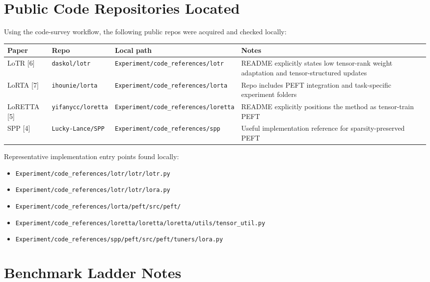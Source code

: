 \documentclass[11pt]{article}
\begin{document}
\section{Public Code Repositories Located}

Using the code-survey workflow, the following public repos were acquired and checked locally:

\begin{longtable}{>{\raggedright\arraybackslash}p{} >{\raggedright\arraybackslash}p{} >{\raggedright\arraybackslash}p{} >{\raggedright\arraybackslash}p{}}
\toprule
Paper & Repo & Local path & Notes \\
\midrule
\endhead
LoTR [6] & \texttt{daskol/lotr} & \texttt{Experiment/code\_references/lotr} & README explicitly states low tensor-rank weight adaptation and tensor-structured updates \\
LoRTA [7] & \texttt{ihounie/lorta} & \texttt{Experiment/code\_references/lorta} & Repo includes PEFT integration and task-specific experiment folders \\
LoRETTA [5] & \texttt{yifanycc/loretta} & \texttt{Experiment/code\_references/loretta} & README explicitly positions the method as tensor-train PEFT \\
SPP [4] & \texttt{Lucky-Lance/SPP} & \texttt{Experiment/code\_references/spp} & Useful implementation reference for sparsity-preserved PEFT \\
\bottomrule
\end{longtable}

Representative implementation entry points found locally:

\begin{itemize}
\item \texttt{Experiment/code\_references/lotr/lotr/lotr.py}
\item \texttt{Experiment/code\_references/lotr/lotr/lora.py}
\item \texttt{Experiment/code\_references/lorta/peft/src/peft/}
\item \texttt{Experiment/code\_references/loretta/loretta/loretta/utils/tensor\_util.py}
\item \texttt{Experiment/code\_references/spp/peft/src/peft/tuners/lora.py}
\end{itemize}

\section{Benchmark Ladder Notes}
\end{document}
